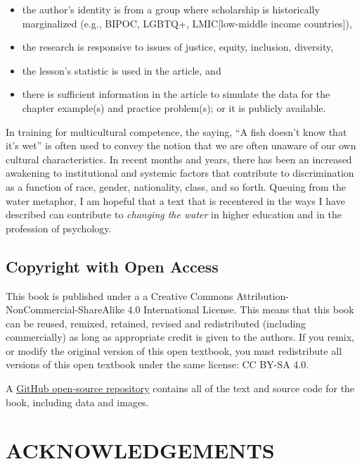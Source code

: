 \documentclass[
  11pt,
]{book}
\providecommand{\tightlist}{%
  \setlength{\itemsep}{0pt}\setlength{\parskip}{0pt}}
\begin{document}
\begin{itemize}
\tightlist
\item
  the author's identity is from a group where scholarship is historically marginalized (e.g., BIPOC, LGBTQ+, LMIC{[}low-middle income countries{]}),
\item
  the research is responsive to issues of justice, equity, inclusion, diversity,
\item
  the lesson's statistic is used in the article, and
\item
  there is sufficient information in the article to simulate the data for the chapter example(s) and practice problem(s); or it is publicly available.
\end{itemize}

In training for multicultural competence, the saying, ``A fish doesn't know that it's wet'' is often used to convey the notion that we are often unaware of our own cultural characteristics. In recent months and years, there has been an increased awakening to institutional and systemic factors that contribute to discrimination as a function of race, gender, nationality, class, and so forth. Queuing from the water metaphor, I am hopeful that a text that is recentered in the ways I have described can contribute to \emph{changing the water} in higher education and in the profession of psychology.

\hypertarget{copyright-with-open-access}{%
\section*{Copyright with Open Access}\label{copyright-with-open-access}}


This book is published under a a Creative Commons Attribution-NonCommercial-ShareAlike 4.0 International License. This means that this book can be reused, remixed, retained, revised and redistributed (including commercially) as long as appropriate credit is given to the authors. If you remix, or modify the original version of this open textbook, you must redistribute all versions of this open textbook under the same license: CC BY-SA 4.0.

A \href{https://github.com/lhbikos/ReCenterPsychStats}{GitHub open-source repository} contains all of the text and source code for the book, including data and images.

\hypertarget{acknowledgements}{%
\chapter*{ACKNOWLEDGEMENTS}\label{acknowledgements}}
\end{document}

